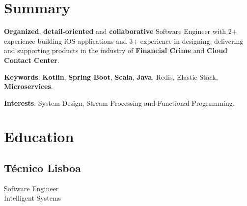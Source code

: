 \documentclass[letterpaper]{deedy-resume} %
\begin{document}
\begin{minipage}[t]{0.33\textwidth} %


\section{Summary}

\textbf{Organized}, \textbf{detail-oriented} and \textbf{collaborative} Software Engineer with 2+ experience building iOS applications and 3+ experience in designing, delivering and supporting products in the industry of \textbf{Financial Crime} and \textbf{Cloud Contact Center}.

\vspace{\topsep}

\textbf{Keywords}: \textbf{Kotlin}, \textbf{Spring Boot}, \textbf{Scala}, \textbf{Java}, Redis, Elastic Stack, \textbf{Microservices}.

\vspace{\topsep}

\textbf{Interests}: System Design, Stream Processing and Functional Programming.

\section{Education} 

\subsection{Técnico Lisboa}

Software Engineer\\
Intelligent Systems \\
\vspace{\topsep}
\vspace{\topsep}

\sectionspace %


\vspace{\topsep}


\end{minipage}
\end{document}
